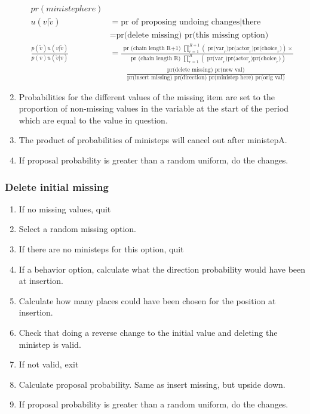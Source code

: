 \documentclass[12pt,a4paper]{article}
\renewcommand{\=}{\,=\,}
\newcommand{\+}{\,+\,}
\begin{document}
\begin{enumerate}
\begin{align*}
{pr(ministep here)} \\
 u(v|\tilde{v}) &= \text{pr of proposing undoing changes} | \text{there} \\
&=\text{pr(delete missing) pr(this missing option)}\\
\frac{p(\tilde{v}) u(v|\tilde{v})}
 {p(v) u(\tilde{v}|v)}&=\frac{\text{ pr (chain length R+1) }
 \prod_{r=1}^{R+1} \left( \text{ pr(var}_r )
\text{pr(actor}_r)\text{pr(choice}_r)\right) \times}{\text{ pr (chain length R) }
 \prod_{r=1}^{R} \left( \text{ pr(var}_r )
\text{pr(actor}_r)\text{pr(choice}_r) \right)}\\
&\qquad \frac{\text{pr(delete missing) pr(new val)} }
{\text{pr(insert missing) pr(direction) pr(ministep here) pr(orig val)} }
\end{align*}
\item Probabilities for the different values of the missing item are set to the
  proportion of non-missing values in the variable at the start of the period
  which are equal to the value in question.
\item The product of probabilities of ministeps will cancel out after ministepA.
\item If proposal probability is greater than a random uniform, do the changes.
\end{enumerate}
\subsubsection{Delete initial missing}
\begin{enumerate}
\item If no missing values, quit
\item Select a random missing option.
\item If there are no ministeps for this option, quit
\item If a behavior option, calculate what the direction probability would have
  been at insertion.
\item Calculate how many places could have been chosen for the position at
  insertion.
\item Check that doing a reverse change to the initial value and deleting the
  ministep is valid.
\item If not valid, exit
\item Calculate proposal probability. Same as insert missing, but upside down.
\item If proposal probability is greater than a random uniform, do the changes.
\end{enumerate}
\end{document}

